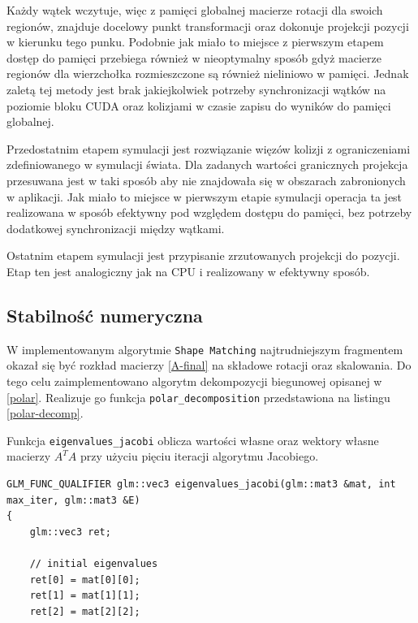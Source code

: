 {Każdy wątek wczytuje, więc z pamięci globalnej macierze rotacji dla swoich regionów, znajduje
docelowy punkt transformacji oraz dokonuje projekcji pozycji w kierunku tego
punku. Podobnie jak miało to miejsce z pierwszym etapem dostęp do pamięci
przebiega również w nieoptymalny sposób gdyż macierze regionów dla wierzchołka rozmieszczone są również
nieliniowo w pamięci. Jednak zaletą tej metody jest brak jakiejkolwiek potrzeby
synchronizacji wątków na poziomie bloku CUDA oraz kolizjami w czasie zapisu do
wyników do pamięci globalnej.
 

Przedostatnim etapem symulacji jest rozwiązanie więzów kolizji z ograniczeniami
zdefiniowanego w symulacji świata. Dla zadanych wartości granicznych projekcja
przesuwana jest w taki sposób aby nie znajdowała się w obszarach zabronionych w
aplikacji. Jak miało to miejsce w pierwszym etapie symulacji operacja ta jest
realizowana w sposób efektywny pod względem dostępu do pamięci, bez potrzeby
dodatkowej synchronizacji między wątkami.

Ostatnim etapem symulacji jest przypisanie zrzutowanych projekcji do pozycji.
Etap ten jest analogiczny jak na CPU i realizowany w efektywny sposób.

\subsection{Stabilność numeryczna}

W implementowanym algorytmie \texttt{Shape Matching} najtrudniejszym fragmentem
okazał się być rozkład macierzy \ref{A-final} na składowe rotacji oraz
skalowania. Do tego celu zaimplementowano algorytm dekompozycji biegunowej
opisanej w \ref{polar}. Realizuje go funkcja \texttt{polar\_decomposition}
przedstawiona na listingu \ref{polar-decomp}.

Funkcja \texttt{eigenvalues\_jacobi} oblicza wartości własne oraz wektory własne
macierzy $A^T A$ przy użyciu pięciu iteracji algorytmu Jacobiego. 

\begin{lstlisting}[caption=Algorytm wyznaczania wartości i wektorów własnych
	macierzy,label=eigenvalues]
GLM_FUNC_QUALIFIER glm::vec3 eigenvalues_jacobi(glm::mat3 &mat, int max_iter, glm::mat3 &E)
{
	glm::vec3 ret;

	// initial eigenvalues
	ret[0] = mat[0][0];
	ret[1] = mat[1][1];
	ret[2] = mat[2][2];


\end{lstlisting}}
